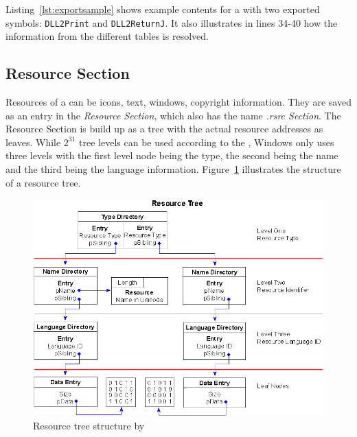 Listing~\ref{lst:exportsample} shows example contents for a \DLL{} with two exported symbols: \texttt{DLL2Print} and \texttt{DLL2ReturnJ}. It also illustrates in lines 34-40  how the information from the different tables is resolved. 



\subsection*{Resource Section}

Resources of a \PE{} can be \ia{} icons, text, windows, copyright information. They are saved as an entry in the \emph{Resource Section}, which also has the name \emph{.rsrc Section}. The Resource Section is build up as a tree with the actual resource addresses as leaves. While \(2^{31}\) tree levels can be used according to the \PECOFF{} \cite[]{pespec}, Windows only uses three levels with the first level node being the type, the second being the name and the third being the language information. Figure~\ref{fig:resourcetree} illustrates the structure of a resource tree.

\begin{figure}[b]
\includegraphics[width=.98\textwidth, height=\textheight,keepaspectratio]{graphics/resourcetree}
\caption{ Resource tree structure by }
\label{fig:resourcetree} 
\end{figure}


